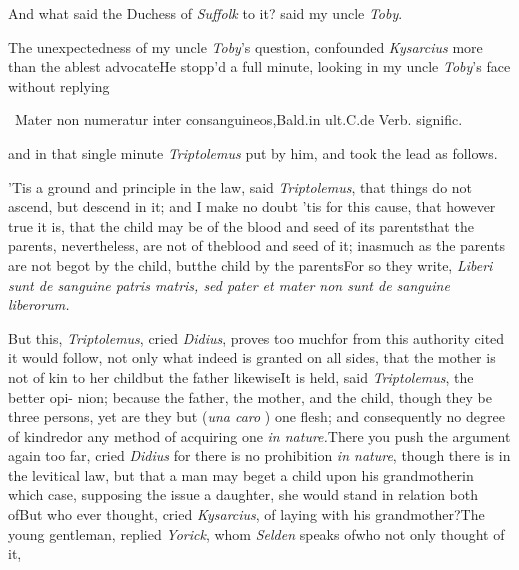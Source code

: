\documentclass[twoside]{article}
\begin{document}
And what said the Duchess of \textit{Suffolk} to it? said my uncle
\textit{Toby}.

The unexpectedness of my uncle\break
\textit{Toby}’s question, confounded \textit{Kysarcius}\break
more than the ablest advocate\tsh He\break
stopp’d a full minute, looking in my\break
uncle \textit{Toby}’s face without replying\tsh\break
{} 

\begingroup\footnotesize\indent\fnast\ 
Mater non numeratur \vrule width0pt depth 4pt
inter consanguineos,\break Bald.\@ in ult.\@ C.\@ de Verb.
signific.\par\endgroup

\newpage\noindent
and in that single minute \textit{Triptolemus} put by him, and took the lead as
follows.

’Tis a ground and principle in the law, said \textit{Triptolemus}, that things do
not ascend, but descend in it; and I make no doubt ’tis for this cause, that however
true it is, that the child may be of the blood and seed of its parents\tsk that the
parents, nevertheless, are not of the\break blood and seed of it; inasmuch as the parents
are not begot by the child, but\break the child by the parents\tsk For so they write,
\textit{Liberi sunt de sanguine patris \et\break matris, sed
pater et mater non sunt de sanguine liberorum.}

\tsk But this, \textit{Triptolemus}, cried \textit{Didius}, proves too much\tsk for from this
authority cited it would follow, not only\break
what indeed is granted on all sides,
that the mother is not of kin to her\break
child\tsk but the father likewise\tsh It is\break 
held, said \textit{Triptolemus}, the better opi-\break
nion; because the father, the mother,\break
and the child, though they be three\break
persons, yet are they but (\textit{una caro} \fnast)\break
one flesh; and consequently no degree\break
of kindred\tsk or any method of acquiring 
one \textit{in nature.}\tsk There you push the argument again too far,
cried \textit{Didius}\tsh\break
for there is no prohibition \textit{in nature},\break
though there is in the levitical law,\tsk\break
but that a man may beget a child upon\break
his grandmother\tsh in which case, supposing
the issue a daughter, she would stand in relation both
of\tsh But who\break
ever thought, cried \textit{Kysarcius}, of laying with his
grandmother?\tsk The young\break
gentleman, replied \textit{Yorick}, whom \textit{Selden}\break
speaks of\tsk who not only thought of it,\break
{}\etp\break
{}
\end{document}
